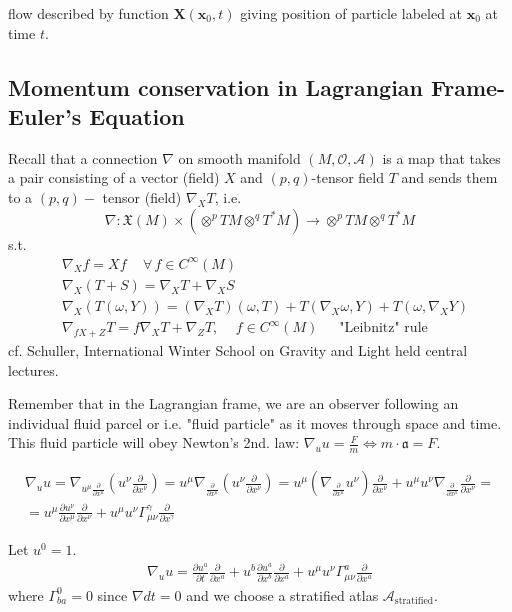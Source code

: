 \documentclass[10pt]{amsart}
\begin{document}
\begin{multicols*}{2}
flow described by function $\mathbf{X}(\mathbf{x}_0, t)$ giving position of particle labeled at $\mathbf{x}_0$ at time $t$.

\subsection{Momentum conservation in Lagrangian Frame-Euler's Equation}

Recall that a connection $\nabla$ on smooth manifold $(M, \mathcal{O}, \mathcal{A})$ is a map that takes a pair consisting of a vector (field) $X$ and $(p,q)$-tensor field $T$ and sends them to a $(p,q)-$ tensor (field) $\nabla_XT$, i.e. 
\[
\nabla : \mathfrak{X}(M) \times (\otimes^p TM \otimes^q T^*M) \to \otimes^p TM \otimes^q T^*M
\]
s.t. 
\[
\begin{aligned}
& \nabla_X f = Xf \quad \, \forall \, f \in C^{\infty}(M) \\ 
& \nabla_X(T + S) = \nabla_X T + \nabla_X S \\ 
& \nabla_X(T(\omega, Y)) = (\nabla_X T)(\omega, T) + T(\nabla_X \omega, Y) + T(\omega, \nabla_X Y) \\
& \nabla_{fX + Z} T = f\nabla_X T + \nabla_Z T , \quad \, f \in C^{\infty}(M) \quad \, \text{ "Leibnitz" rule }
\end{aligned}
\]
cf. Schuller, International Winter School on Gravity and Light held central lectures.

Remember that in the Lagrangian frame, we are an observer following an individual fluid parcel or i.e. "fluid particle" as it moves through space and time. This fluid particle will obey Newton's 2nd. law: $\nabla_{u} u = \frac{F}{m} \Longleftrightarrow m \cdot \mathfrak{a} = F$. 

\[
\begin{gathered}
\nabla_u u = \nabla_{u^{\mu}\frac{\partial}{\partial x^{\mu}}} (u^{\nu} \frac{\partial}{\partial x^{\nu}}) = u^{\mu} \nabla_{\frac{ \partial }{\partial x^{\mu}} } (u^{\nu} \frac{ \partial }{ \partial x^{\nu}}) =  u^{\mu} \left( \nabla_{\frac{ \partial }{\partial x^{\mu}} } u^{\nu} \right) \frac{ \partial }{ \partial x^{\nu}} + u^{\mu} u^{\nu} \nabla_{\frac{ \partial }{\partial x^{\mu}} }  \frac{ \partial }{ \partial x^{\nu}} = \\
	= u^{\mu} \frac{ \partial u^{\nu} }{ \partial x^{\mu}} \frac{\partial}{\partial x^{\nu}} + u^{\mu}u^{\nu} \Gamma^{\gamma}_{\mu \nu} \frac{\partial}{\partial x^{\gamma}}
	\end{gathered}
	\]

Let $u^0 = 1$.
\[
\begin{gathered}
\nabla_u u = \frac{\partial u^a}{\partial t} \frac{\partial }{ \partial x^a} + u^b \frac{\partial u^a}{\partial x^b} \frac{\partial}{\partial x^a} + u^{\mu} u^{\nu} \Gamma^a_{\mu \nu} \frac{\partial}{\partial x^a}
\end{gathered}
\]
where $\Gamma^0_{ba} = 0$ since $\nabla dt =0$ and we choose a stratified atlas $\mathcal{A}_{\text{stratified}}$.


\end{multicols*}
\end{document}
